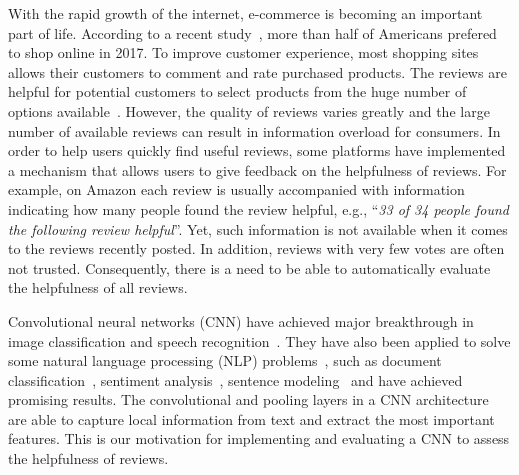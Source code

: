 \documentclass[conference,compsoc]{IEEEtran}
\begin{document}
With the rapid growth of the internet, e-commerce is becoming an important part of life. According to a recent study~\cite{survey1}, more than half of Americans prefered to shop online in 2017. To improve customer experience, most shopping sites allows their customers to comment and rate purchased products. The reviews are helpful for potential customers to select products from the huge number of options available~\cite{Zhu_2010, Mudambi_2010, Baek_2012}. However, the quality of reviews varies greatly and the large number of available reviews can result in information overload for consumers.  In order to help users quickly find useful reviews, some platforms have implemented a mechanism that allows users to give feedback on the helpfulness of reviews. For example, on Amazon each review is usually accompanied with information indicating how many people found the review helpful, e.g., ``\textit{33 of 34 people found the following review helpful}''. Yet, such information is not available when it comes to the reviews recently posted. In addition, reviews with very few votes are often not trusted. Consequently, there is a need to be able to automatically evaluate the helpfulness of all reviews.


Convolutional neural networks (CNN) have achieved major breakthrough in image classification and speech recognition~\cite{Krizhevsky_2012,Graves_2013}. They have also been applied to solve some natural language processing (NLP) problems~\cite{Goldberg_2015,Moreno_2017}, such as document classification~\cite{NIPS2015_zhang, AAAI159745, Johnson_2015, Yang2016HierarchicalAN, Hoa_2017}, sentiment analysis~\cite{Kim14f}, sentence modeling~\cite{KalchbrennerACL2014, Kim_2016} and have achieved promising results. The convolutional and pooling layers in a CNN architecture are able to capture local information from text and extract the most important features. This is our motivation for implementing and evaluating a CNN to assess the helpfulness of reviews. %
\end{document}
